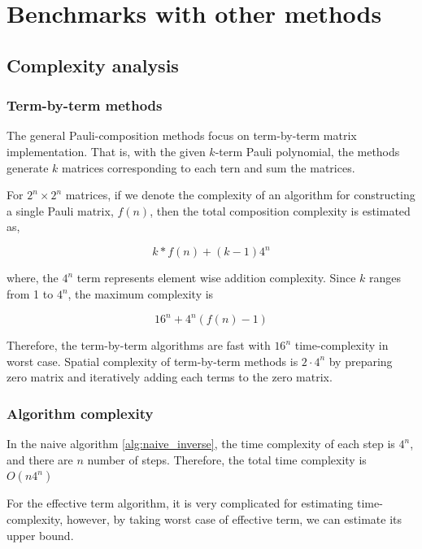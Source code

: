 \documentclass[twocolumn]{article}
\begin{document}
\section{Benchmarks with other methods}

\subsection{Complexity analysis}

\subsubsection{Term-by-term methods}

The general Pauli-composition methods focus on 
term-by-term matrix implementation. That is, with the given 
$k$-term Pauli polynomial, the methods generate $k$ matrices corresponding to 
each tern and sum the matrices.

For $2^n \times 2^n$ matrices, if we denote the complexity of an algorithm for constructing a single Pauli matrix,
$f(n)$, then the total composition complexity is estimated as,

\begin{equation}
    \label{eq:k-complexity}
    k * f(n) + (k-1) 4^n
\end{equation}

where, the $4^n$ term represents element wise addition complexity.
Since $k$ ranges from 1 to $4^n$, the maximum complexity is

\begin{equation}
    \label{eq:max_complexity}
    16^n + 4^n(f(n)-1)
\end{equation}

Therefore, the term-by-term algorithms are fast with $16^n$ time-complexity in worst case.
Spatial complexity of term-by-term methods is $2 \cdot 4^n$ by preparing 
zero matrix and iteratively adding each terms to the zero matrix.

\subsubsection{Algorithm complexity}

In the naive algorithm \ref{alg:naive_inverse},
the time complexity of each step is $4^n$, and there are $n$ 
number of steps. 
Therefore, the total time complexity is $O(n4^n)$

For the effective term algorithm,
it is very complicated for estimating time-complexity,
however, by taking worst case of effective term, we can estimate its upper bound.
\end{document}
